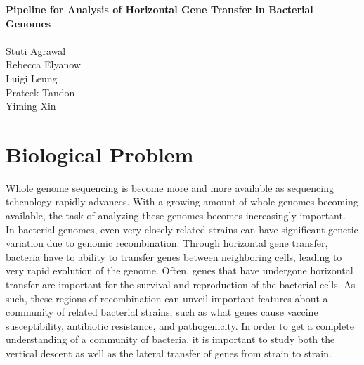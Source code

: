 \documentclass[12pt]{article}
\newcommand{\tab}{\hspace*{3em}}
\begin{document}
\begin{center}
\textbf{\LARGE{Pipeline for Analysis of Horizontal Gene Transfer in Bacterial Genomes}}\\
~~~\\
\Large{Stuti Agrawal}\\
\Large{Rebecca Elyanow}\\
\Large{Luigi Leung}\\
\Large{Prateek Tandon}\\
\Large{Yiming Xin}
\end{center}
\tableofcontents
\newpage
%
\section{Biological Problem}
\tab Whole genome sequencing is become more and more available as sequencing tehcnology rapidly advances. With a growing amount of whole genomes becoming available, the task of analyzing these genomes becomes increasingly important. \\
\tab In bacterial genomes, even very closely related strains can have significant genetic variation due to genomic recombination. Through horizontal gene transfer, bacteria have to ability to transfer genes between neighboring cells, leading to very rapid evolution of the genome. Often, genes that have undergone horizontal transfer are important for the survival and reproduction of the bacterial cells. As such, these regions of recombination can unveil important features about a community of related bacterial strains, such as what genes cause vaccine susceptibility, antibiotic resistance, and pathogenicity. In order to get a complete understanding of a community of bacteria, it is important to study both the vertical descent as well as the lateral transfer of genes from strain to strain.\\
\end{document}
